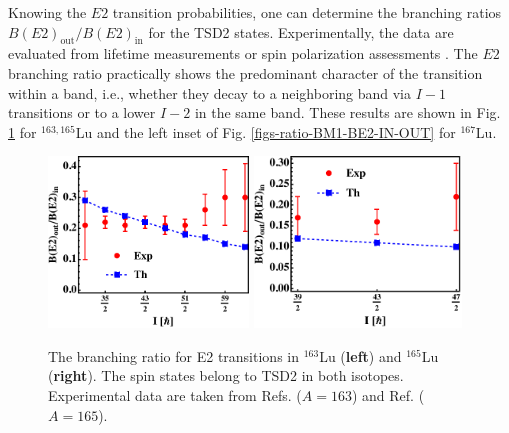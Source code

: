Knowing the $E2$ transition probabilities, one can determine the branching ratios $B(E2)_\text{out}/B(E2)_\text{in}$ for the TSD2 states. Experimentally, the data are evaluated from lifetime measurements or spin polarization assessments \cite{timar2019experimental,sensharma2021wobbling,lvThesis}. The $E2$ branching ratio practically shows the predominant character of the transition within a band, i.e., whether they decay to a neighboring band via $I-1$ transitions or to a lower $I-2$ in the same band. These results are shown in Fig. \ref{figs-BE2-IN-OUT} for $^{163,165}$Lu and the left inset of Fig. \ref{figs-ratio-BM1-BE2-IN-OUT} for $^{167}$Lu.
\begin{figure}
    \centering
    \includegraphics[width=0.475\textwidth]{Chapters/Figures/BE2inout-1.pdf}
    \includegraphics[width=0.49\textwidth]{Chapters/Figures/BE2inout-2.pdf}
    \caption{The branching ratio for E2 transitions in $^{163}$Lu (\textbf{left}) and $^{165}$Lu (\textbf{right}). The spin states belong to TSD2 in both isotopes. Experimental data are taken from Refs. \cite{hagemann2003wobbling,hamamoto2003nuclear,jensen2002evidence} ($A=163$) and Ref. \cite{schonwasser2003one} ($A=165$).}
    \label{figs-BE2-IN-OUT}
\end{figure}


